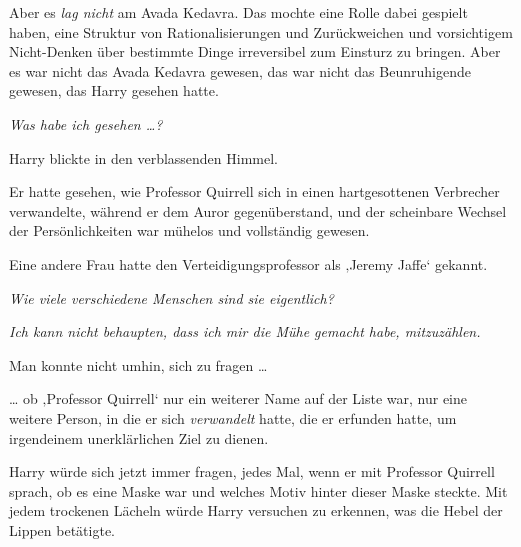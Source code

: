 Aber es \emph{lag nicht} am Avada Kedavra. Das mochte eine Rolle dabei gespielt haben, eine Struktur von Rationalisierungen und Zurückweichen und vorsichtigem Nicht-Denken über bestimmte Dinge irreversibel zum Einsturz zu bringen. Aber es war nicht das Avada Kedavra gewesen, das war nicht das Beunruhigende gewesen, das Harry gesehen hatte.

\emph{Was habe ich gesehen …?}

Harry blickte in den verblassenden Himmel.

Er hatte gesehen, wie Professor Quirrell sich in einen hartgesottenen Verbrecher verwandelte, während er dem Auror gegenüberstand, und der scheinbare Wechsel der Persönlichkeiten war mühelos und vollständig gewesen.

Eine andere Frau hatte den Verteidigungsprofessor als ‚Jeremy Jaffe‘ gekannt.

\emph{Wie viele verschiedene Menschen sind sie eigentlich?}

\emph{Ich kann nicht behaupten, dass ich mir die Mühe gemacht habe, mitzuzählen.}

Man konnte nicht umhin, sich zu fragen …

… ob ‚Professor Quirrell‘ nur ein weiterer Name auf der Liste war, nur eine weitere Person, in die er sich \emph{verwandelt} hatte, die er erfunden hatte, um irgendeinem unerklärlichen Ziel zu dienen.

Harry würde sich jetzt immer fragen, jedes Mal, wenn er mit Professor Quirrell sprach, ob es eine Maske war und welches Motiv hinter dieser Maske steckte. Mit jedem trockenen Lächeln würde Harry versuchen zu erkennen, was die Hebel der Lippen betätigte.


